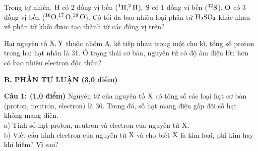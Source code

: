 \documentclass[11pt,a4paper]{article}
\begin{document}
\begin{ex}
Trong tự nhiên, $\ce{H}$ có 2 đồng vị bền ($^1\ce{H}, ^2\ce{H}$), $\ce{S}$ có 1 đồng vị bền ($^{32}\ce{S}$), $\ce{O}$ có 3 đồng vị bền ($^{16}\ce{O}, ^{17}\ce{O}, ^{18}\ce{O}$). Có tối đa bao nhiêu loại phân tử $\ce{H2SO4}$ khác nhau về phân tử khối được tạo thành từ các đồng vị trên?

\end{ex}
\begin{ex}
Hai nguyên tố $\ce{X, Y}$ thuộc nhóm A, kế tiếp nhau trong một chu kì, tổng số proton trong hai hạt nhân là 31. Ở trạng thái cơ bản, nguyên tử có độ âm điện lớn hơn có bao nhiêu electron độc thân?

\end{ex}
\vspace{6pt}
\noindent
{\color{mainGreen}\textbf{\Large B. PHẦN TỰ LUẬN (3,0 điểm)}}
\vspace{2pt}

\noindent
\textbf{Câu 1: (1,0 điểm)} Nguyên tử của nguyên tố $\ce{X}$ có tổng số các loại hạt cơ bản (proton, neutron, electron) là 36. Trong đó, số hạt mang điện gấp đôi số hạt không mang điện.\\
a) Tính số hạt proton, neutron và electron của nguyên tử $\ce{X}$.\\
b) Viết cấu hình electron của nguyên tử $\ce{X}$ và cho biết $\ce{X}$ là kim loại, phi kim hay khí hiếm? Vì sao?
\end{document}
